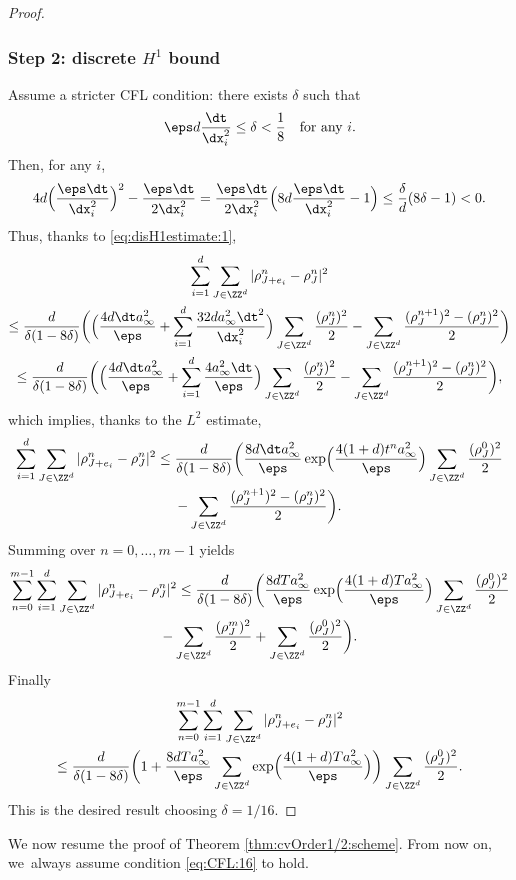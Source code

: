 \begin{proof}
\subsubsection*{Step 2: discrete $H^1$ bound}
Assume a stricter CFL condition: there exists $\delta$ such that
\begin{equation}\label{eq:CFL:16}
\eps d \frac{\dt}{\dx_i^2} \leq \delta < \frac 18 \quad \text{for any } i.
\end{equation}
Then, for any $i$,
\[
4d\Bigl(\frac{\eps \dt}{\dx_i^2}\Bigr)^2 - \frac{\eps \dt}{2\dx_i^2}
= \frac{\eps \dt}{2\dx_i^2}\Bigl(8d\frac{\eps \dt}{\dx_i^2} - 1\Bigr) \leq \frac{\delta}{d}(8\delta - 1) < 0.
\]
Thus, thanks to \ref{eq:disH1estimate:1},
\begin{multline*}
\sum_{i=1}^{d} \sum_{J \in \ZZ^d} |\rho_{J+e_i}^n - \rho_J^n|^2 \\
\leq
\frac{d}{\delta(1 - 8\delta)}\biggl(\Bigl(\frac{4d\dt a_\infty^2}{\eps} + \sum_{i=1}^{d} \frac{32 d a_\infty^2\dt^2}{\dx_i^2}\Bigr) \sum_{J\in\ZZ^d} \frac{(\rho_J^n)^2}{2}
- \sum_{J \in \ZZ^d} \frac{(\rho_J^{n+1})^2 -(\rho_J^n)^2}{2} \biggr) \\
\leq
\frac{d}{\delta(1 - 8\delta)}\biggl(\Bigl(\frac{4d\dt a_\infty^2}{\eps} + \sum_{i=1}^{d} \frac{4 a_\infty^2\dt}{\eps} \Bigr) \sum_{J\in\ZZ^d} \frac{(\rho_J^n)^2}{2}
- \sum_{J \in \ZZ^d} \frac{(\rho_J^{n+1})^2 -(\rho_J^n)^2}{2} \biggr),
\end{multline*}
which implies, thanks to the $L^2$ estimate,
\begin{multline*}
\sum_{i=1}^{d} \sum_{J \in \ZZ^d} |\rho_{J+e_i}^n - \rho_J^n|^2 \leq
\frac{d}{\delta(1 - 8\delta)} \biggl(\frac{8d\dt a_\infty^2}{\eps}
\exp\Bigl(\frac{4(1 + d)t^n a_\infty^2}{\eps}\Bigr) \sum_{J \in \ZZ^d} \frac{(\rho_J^0)^2}{2}
\\
- \sum_{J \in \ZZ^d} \frac{(\rho_J^{n+1})^2
-(\rho_J^n)^2}{2} \biggr).
\end{multline*}
Summing over $n=0,\ldots,m-1$ yields
\begin{multline*}
\sum_{n = 0}^{m-1} \sum_{i=1}^{d} \sum_{J \in \ZZ^d} |\rho_{J+e_i}^n - \rho_J^n|^2 \leq
\frac{d}{\delta(1 - 8\delta)} \biggl(\frac{8dT a_\infty^2}{\eps}
\exp\Bigl(\frac{4(1 + d)T a_\infty^2}{\eps}\Bigr) \sum_{J \in \ZZ^d} \frac{(\rho_J^0)^2}{2}
\\
 - \sum_{J \in \ZZ^d} \frac{(\rho_J^{m})^2}{2}
+ \sum_{J \in \ZZ^d} \frac{(\rho_J^0)^2}{2} \biggr).
\end{multline*}
Finally
\begin{multline*}
\sum_{n = 0}^{m-1} \sum_{i=1}^{d} \sum_{J \in \ZZ^d} |\rho_{J+e_i}^n - \rho_J^n|^2 \\
\leq
\frac{d}{\delta(1 - 8\delta)} \biggl(1 + \frac{8dT a_\infty^2}{\eps} \sum_{J\in\ZZ^d}
\exp\Bigl(\frac{4(1 + d)T a_\infty^2}{\eps} \Bigr)\biggr) \sum_{J \in \ZZ^d} \frac{(\rho_J^0)^2}{2}.
\end{multline*}
This is the desired result choosing $\delta = 1/16$.
\end{proof}
We now resume the proof of Theorem \ref{thm:cvOrder1/2:scheme}. From now on, we~always assume condition \eqref{eq:CFL:16} to hold.

